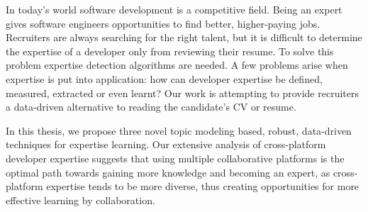 In today's world software development is a competitive field. Being an expert gives software engineers opportunities to find better, higher-paying jobs. Recruiters are always searching for the right talent, but it is difficult to determine the expertise of a developer only from reviewing their resume. To solve this problem expertise detection algorithms are needed. A few problems arise when expertise is put into application: how can developer expertise be defined, measured, extracted or even learnt? Our work is attempting to provide recruiters a data-driven alternative to reading the candidate's CV or resume. 

In this thesis, we propose three novel topic modeling based, robust, data-driven techniques for expertise learning. Our extensive analysis of cross-platform developer expertise suggests that using multiple collaborative platforms is the optimal path towards gaining more knowledge and becoming an expert, as cross-platform expertise tends to be more diverse, thus creating opportunities for more effective learning by collaboration.

